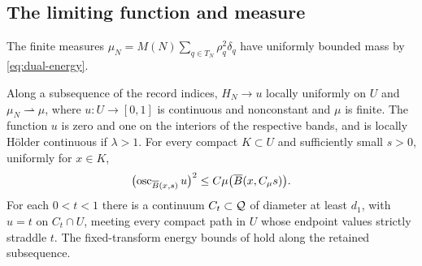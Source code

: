 \subsection{The limiting function and measure}

The finite measures
$\mu_N=M(N)\sum_{q\in T_N}\rho_q^2\delta_q$
have uniformly bounded mass by \eqref{eq:dual-energy}.

\begin{proposition}
\label{prop:scalar-limit}
Along a subsequence of the record indices,
$H_N\to u$ locally uniformly on $U$ and $\mu_N\rightharpoonup\mu$,
where $u:U\to[0,1]$ is continuous and nonconstant and $\mu$ is finite.
The function $u$ is zero and one on the interiors of the respective
bands, and is locally H\"older continuous if $\lambda>1$.
For every compact $K\subset U$ and sufficiently small
$s>0$, uniformly for $x\in K$,
\begin{equation}
 \bigl(\operatorname{osc}_{\overline B(x,s)}u\bigr)^2
       \leq C\mu\bigl(\overline B(x,C_\mu s)\bigr).
 \label{eq:measure}
\end{equation}
For each $0<t<1$ there is a continuum $C_t\subset\mathcal Q$ of diameter
at least $d_1$, with $u=t$ on $C_t\cap U$, meeting every compact
path in $U$ whose endpoint values strictly straddle $t$.
The fixed-transform energy bounds of 
hold along the retained subsequence.
\end{proposition}
